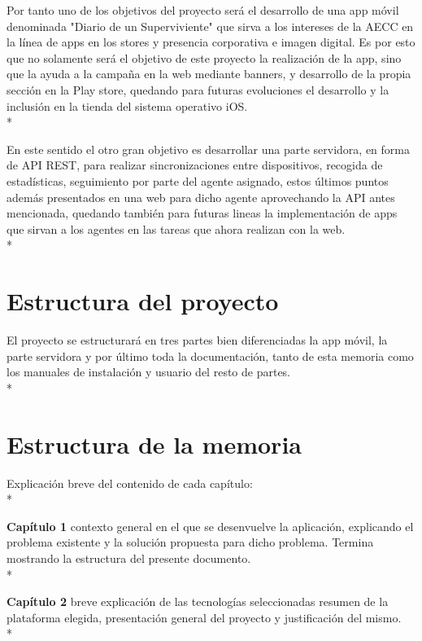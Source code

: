 \documentclass[../pfc.tex]{subfiles}
\begin{document}
Por tanto uno de los objetivos del proyecto será el desarrollo de una app móvil denominada "Diario de un Superviviente" que sirva a los intereses de la AECC en la línea de apps en los stores y presencia corporativa e imagen digital. Es por esto que no solamente será el objetivo de este proyecto la realización de la app, sino que la ayuda a la campaña en la web mediante banners, y desarrollo de la propia sección en la Play store, quedando para futuras evoluciones el desarrollo y la inclusión en la tienda del sistema operativo iOS.\\*

En este sentido el otro gran objetivo es desarrollar una parte servidora, en forma de API REST, para realizar sincronizaciones entre dispositivos, recogida de estadísticas, seguimiento por parte del agente asignado, estos últimos puntos además presentados en una web para dicho agente aprovechando la API antes mencionada, quedando también para futuras lineas la implementación de apps que sirvan a los agentes en las tareas que ahora realizan con la web.\\*

\section{Estructura del proyecto}

El proyecto se estructurará en tres partes bien diferenciadas la app móvil, la parte servidora y por último toda la documentación, tanto de esta memoria como los manuales de instalación y usuario del resto de partes.\\* 

\section{Estructura de la memoria}

Explicación breve del contenido de cada capítulo:\\*

  \textbf{Capítulo 1} contexto general en el que se desenvuelve la aplicación, explicando el problema existente y la solución propuesta para dicho problema. Termina mostrando la estructura del presente documento.\\*
  
  \textbf{Capítulo 2} breve explicación de las tecnologías seleccionadas resumen de la plataforma elegida, presentación general del proyecto y justificación del mismo.\\*
  
\end{document}

